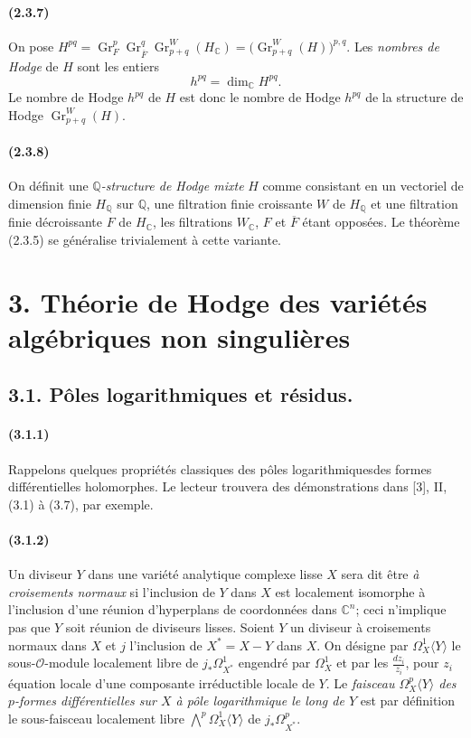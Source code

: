 \documentclass[10pt]{article}
\newcommand{\C}{\mathbb C}
\newcommand{\Q}{\mathbb Q}
\newcommand{\Gr}{\operatorname{Gr}}
\newcommand{\fg}{\guillemotright}
\newcommand{\og}{\guillemotleft}
\providecommand{\cO}{\mathcal O}
\providecommand{\cO}{\mathcal O}
\begin{document}
\paragraph{(2.3.7)} On pose $H^{pq}=\Gr_F^p\Gr_{\overline F}^q\Gr_{p+q}^W(H_\C)=\bigl(\Gr_{p+q}^W(H)\bigr)^{p,q}$. Les \emph{nombres de Hodge} de $H$ sont les entiers
\[
h^{pq}=\dim_\C H^{pq}.
\]
Le nombre de Hodge $h^{pq}$ de $H$ est donc le nombre de Hodge $h^{pq}$ de la structure de Hodge $\Gr_{p+q}^W(H)$.

\paragraph{(2.3.8)} On définit une \emph{$\Q$-structure de Hodge mixte} $H$ comme consistant en un vectoriel de dimension finie $H_\Q$ sur $\Q$, une filtration finie croissante $W$ de $H_\Q$ et une filtration finie décroissante $F$ de $H_\C$, les filtrations $W_\C$, $F$ et $\overline F$ étant opposées. Le théorème (2.3.5) se généralise trivialement à cette variante.

\section*{3. Théorie de Hodge des variétés algébriques non singulières}

\subsection*{3.1. Pôles logarithmiques et résidus.}

\paragraph{(3.1.1)} Rappelons quelques propriétés classiques des \og pôles logarithmiques\fg des formes différentielles holomorphes. Le lecteur trouvera des démonstrations dans [3], II, (3.1) à (3.7), par exemple.

\paragraph{(3.1.2)} Un diviseur $Y$ dans une variété analytique complexe lisse $X$ sera dit être \emph{à croisements normaux} si l'inclusion de $Y$ dans $X$ est localement isomorphe à l'inclusion d'une réunion d'hyperplans de coordonnées dans $\C^n$; ceci n'implique pas que $Y$ soit réunion de diviseurs lisses. Soient $Y$ un diviseur à croisements normaux dans $X$ et $j$ l'inclusion de $X^*=X-Y$ dans $X$. On désigne par $\Omega_X^1\langle Y\rangle$ le sous-$\cO$-module localement libre de $j_*\Omega_{X^*}^1$ engendré par $\Omega_X^1$ et par les $\frac{dz_i}{z_i}$, pour $z_i$ équation locale d'une composante irréductible locale de $Y$. Le \emph{faisceau $\Omega_X^p\langle Y\rangle$ des $p$-formes différentielles sur $X$ à pôle logarithmique le long de $Y$} est par définition le sous-faisceau localement libre $\bigwedge^p\Omega_X^1\langle Y\rangle$ de $j_*\Omega_{X^*}^p$.
\end{document}
